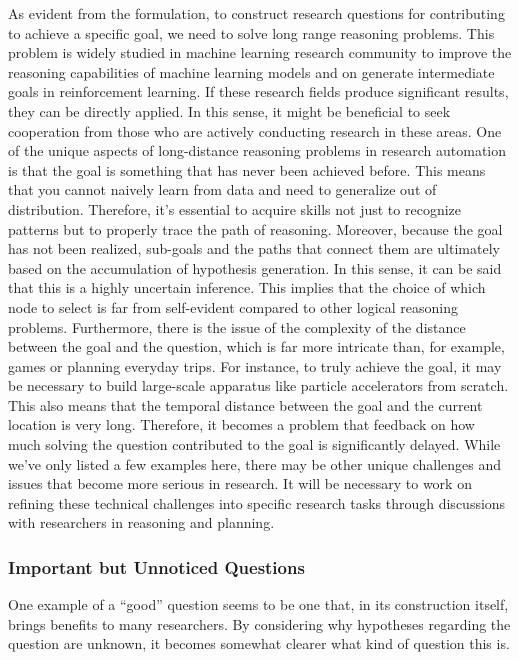 As evident from the formulation, to construct research questions for contributing to achieve a specific goal, we need to solve long range reasoning problems. This problem is widely studied in machine learning research community to improve the reasoning capabilities of machine learning models and on generate intermediate goals in reinforcement learning. If these research fields produce significant results, they can be directly applied. In this sense, it might be beneficial to seek cooperation from those who are actively conducting research in these areas. One of the unique aspects of long-distance reasoning problems in research automation is that the goal is something that has never been achieved before. This means that you cannot naively learn from data and need to generalize out of distribution. Therefore, it's essential to acquire skills not just to recognize patterns but to properly trace the path of reasoning. Moreover, because the goal has not been realized, sub-goals and the paths that connect them are ultimately based on the accumulation of hypothesis generation. In this sense, it can be said that this is a highly uncertain inference. This implies that the choice of which node to select is far from self-evident compared to other logical reasoning problems. Furthermore, there is the issue of the complexity of the distance between the goal and the question, which is far more intricate than, for example, games or planning everyday trips. For instance, to truly achieve the goal, it may be necessary to build large-scale apparatus like particle accelerators from scratch. This also means that the temporal distance between the goal and the current location is very long. Therefore, it becomes a problem that feedback on how much solving the question contributed to the goal is significantly delayed. While we've only listed a few examples here, there may be other unique challenges and issues that become more serious in research. It will be necessary to work on refining these technical challenges into specific research tasks through discussions with researchers in reasoning and planning.

\subsubsection{Important but Unnoticed Questions}

One example of a ``good'' question seems to be one that, in its construction itself, brings benefits to many researchers. By considering why hypotheses regarding the question are unknown, it becomes somewhat clearer what kind of question this is.

